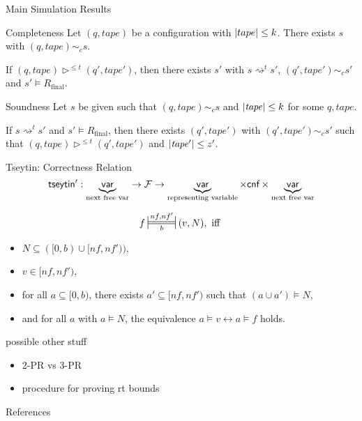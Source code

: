 \documentclass[11pt,usenames,dvipsnames,
hyperref={pdfencoding=auto,psdextra}]{beamer}
\newcommand{\reprc}{\ensuremath{\sim_c}}
\newcommand{\Rfinal}{R_{\text{final}}}
\begin{document}
\begin{frame}{Main Simulation Results}
  \begin{block}{Completeness}
    Let $(q, \mathit{tape})$ be a configuration with $|tape| \le k$. There exists $s$ with $(q, \mathit{tape}) \reprc{} s$.

    If $(q, \mathit{tape}) \triangleright^{\le t} (q', \mathit{tape}')$, then there exists $s'$ with $s \rightsquigarrow^t s'$, $(q', \mathit{tape}') \reprc{} s'$ and $s' \models \Rfinal$. 
  \end{block}

  \begin{block}{Soundness}
    Let $s$ be given such that $(q, \mathit{tape}) \reprc{} s$ and $|\mathit{tape}| \le k$ for some $q, \mathit{tape}$. 

    If $s \rightsquigarrow^t s'$ and $s' \models \Rfinal$, then there exists $(q', \mathit{tape}')$ with $(q', \mathit{tape}') \reprc{} s'$ such that $(q, \mathit{tape}) \triangleright^{\le t} (q', \mathit{tape}')$ and $|\mathit{tape}'| \le z'$. 
  \end{block}
\end{frame}

\newcommand{\Frepr}[3]{\sdststile{\ensuremath{#3}}{\ensuremath{#1, #2}}}
\begin{frame}{Tseytin: Correctness Relation}
  \[ \textsf{tseytin}' : \underbrace{\textsf{var}}_{\text{next free var}} \rightarrow \mathcal{F}{} \rightarrow \underbrace{\textsf{var}}_{\text{representing variable}} \times \textsf{cnf} \times \underbrace{\textsf{var}}_{\text{next free var}} \] 
  
  \[ f \Frepr{nf}{nf'}{b} (v, N), \text{ iff } \]
  \begin{itemize} 
    \item $N \subseteq ([0, b) \cup [nf, nf'))$,
    \item $v \in [nf, nf')$,
    \item for all $a \subseteq [0, b)$, there exists $a' \subseteq [nf, nf')$ such that $(a \cup a') \models N$,
    \item and for all $a$ with $a \models N$, the equivalence $a \models v \leftrightarrow a \models f$ holds.
  \end{itemize}
\end{frame}

\begin{frame}{possible other stuff}
  \begin{itemize}
    \item 2-PR vs 3-PR
    \item procedure for proving rt bounds
  \end{itemize}
\end{frame}

\begin{frame}[allowframebreaks]{References}
  \nocite{Sipser:TheoryofComputation}
  \nocite{Bläser:TISkript}
  
  {}
\end{frame}
\end{document}
